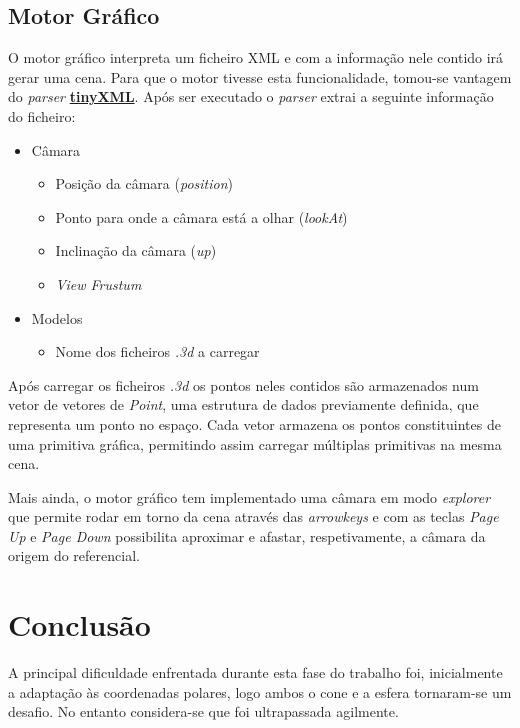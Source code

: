 \documentclass[11pt,a4paper]{report}
\begin{document}
\section{Motor Gráfico}
O motor gráfico interpreta um ficheiro XML e com a informação nele contido irá gerar uma cena. Para que o motor tivesse esta funcionalidade, tomou-se vantagem do \textit{parser} \href{http://www.grinninglizard.com/tinyxml/}{\textbf{tinyXML}}.
Após ser executado o \textit{parser} extrai a seguinte informação do ficheiro:
\begin{itemize}
    \item Câmara
    \begin{itemize}
        \item Posição da câmara (\textit{position})
        \item Ponto para onde a câmara está a olhar (\textit{lookAt})
        \item Inclinação da câmara (\textit{up})
        \item \textit{View Frustum} 
    \end{itemize}
    \item Modelos
    \begin{itemize}
        \item Nome dos ficheiros \textit{.3d} a carregar
        
    \end{itemize}
    
    
    
\end{itemize}

Após carregar os ficheiros \textit{.3d} os pontos neles contidos são armazenados num vetor de vetores de \textit{Point}, uma estrutura de dados previamente definida, que representa um ponto no espaço. Cada vetor armazena os pontos constituintes de uma primitiva gráfica, permitindo assim carregar múltiplas primitivas na mesma cena.

\newline 
Mais ainda, o  motor gráfico tem implementado uma câmara em modo \textit{explorer} que  permite rodar em torno da cena através das \textit{arrowkeys} e com as teclas \textit{Page Up} e \textit{Page Down} possibilita aproximar e afastar, respetivamente, a câmara da origem do referencial.


\newpage
\chapter{Conclusão}
A principal dificuldade enfrentada durante esta fase do trabalho foi, inicialmente a adaptação às coordenadas polares, logo ambos o cone e a esfera tornaram-se um desafio. No entanto considera-se que foi ultrapassada agilmente.
\end{document}
